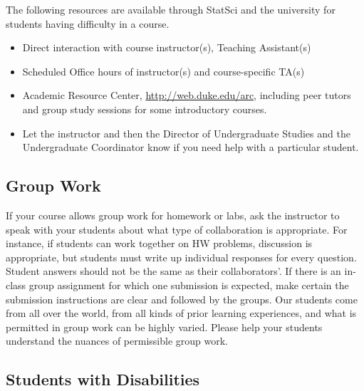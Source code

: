 \documentclass[
]{article}
\begin{document}
The following resources are available through StatSci and the university for students having difficulty in a course.

\begin{itemize}
\item
  Direct interaction with course instructor(s), Teaching Assistant(s)
\item
  Scheduled Office hours of instructor(s) and course-specific TA(s)
\item
  Academic Resource Center, \url{http://web.duke.edu/arc}, including peer tutors and group study sessions for some introductory courses.
\item
  Let the instructor and then the Director of Undergraduate Studies and the Undergraduate Coordinator know if you need help with a particular student.
\end{itemize}

\hypertarget{group-work}{%
\subsection{Group Work}\label{group-work}}

If your course allows group work for homework or labs, ask the instructor to speak with your students about what type of collaboration is appropriate. For instance, if students can work together on HW problems, discussion is appropriate, but students must write up individual responses for every question. Student answers should not be the same as their collaborators'. If there is an in-class group assignment for which one submission is expected, make certain the submission instructions are clear and followed by the groups. Our students come from all over the world, from all kinds of prior learning experiences, and what is permitted in group work can be highly varied. Please help your students understand the nuances of permissible group work.

\hypertarget{students-with-disabilities}{%
\subsection{Students with Disabilities}\label{students-with-disabilities}}
\end{document}
